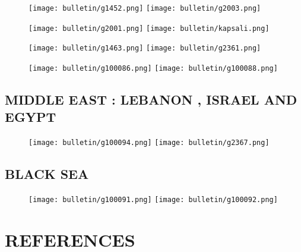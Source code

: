 \documentclass[a4paper]{article}
\renewcommand{\\}{\ {\large\textperiodcentered}\ }
\renewcommand{\\}{\ {\large\textperiodcentered}\ }
\begin{document}
\begin{figure}[h]
\centerline{
\texttt{[image: bulletin/g1452.png]}
\texttt{[image: bulletin/g2003.png]}
}
\end{figure}

\begin{figure}[h]
\centerline{
\texttt{[image: bulletin/g2001.png]}
\texttt{[image: bulletin/kapsali.png]}
}
\end{figure}

\begin{figure}[h]
\centerline{
\texttt{[image: bulletin/g1463.png]}
\texttt{[image: bulletin/g2361.png]}
}
\end{figure}

\begin{figure}[h]
\centerline{
\texttt{[image: bulletin/g100086.png]}
\texttt{[image: bulletin/g100088.png]}
}
\end{figure}

\begin{figure}[h]
\end{figure}


\newpage
\subsection*{MIDDLE EAST : LEBANON , ISRAEL AND EGYPT}

\begin{figure}[h]
\centerline{
\texttt{[image: bulletin/g100094.png]}
\texttt{[image: bulletin/g2367.png]}
}
\end{figure}

\begin{figure}[h]
\end{figure}

\subsection*{BLACK SEA}

\begin{figure}[h]
\centerline{
\texttt{[image: bulletin/g100091.png]}
\texttt{[image: bulletin/g100092.png]}
}
\end{figure}

\begin{figure}[h]
\end{figure}

\newpage
\section*{REFERENCES}
\end{document}
